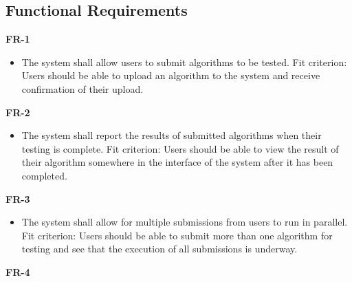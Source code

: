 \documentclass[12pt]{article}
\begin{document}
\subsection{Functional Requirements}
\textbf{FR-1}
\begin{itemize}
    \item The system shall allow users to submit algorithms to be tested. \hfill \break
    Fit criterion: Users should be able to upload an algorithm to the system and receive confirmation of their upload.
\end{itemize}
\textbf{FR-2}
\begin{itemize}
    \item The system shall report the results of submitted algorithms when their testing is complete. \hfill \break
    Fit criterion: Users should be able to view the result of their algorithm somewhere in the interface of the system after it has been completed.
\end{itemize}
\textbf{FR-3}
\begin{itemize}
    \item The system shall allow for multiple submissions from users to run in parallel. \hfill \break
    Fit criterion: Users should be able to submit more than one algorithm for testing and see that the execution of all submissions is underway.
\end{itemize}
\textbf{FR-4}
\end{document}

